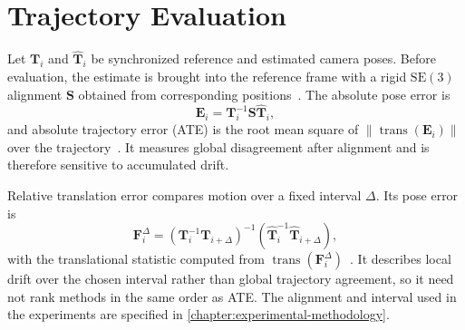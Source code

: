\section{Trajectory Evaluation}

Let $\mathbf{T}_i$ and $\widehat{\mathbf{T}}_i$ be synchronized reference and estimated camera poses. Before evaluation, the estimate is brought into the reference frame with a rigid $\mathrm{SE}(3)$ alignment $\mathbf{S}$ obtained from corresponding positions~\cite{umeyama1991least}. The absolute pose error is
\begin{equation}
  \mathbf{E}_i = \mathbf{T}_i^{-1}\mathbf{S}\widehat{\mathbf{T}}_i,
\end{equation}
and absolute trajectory error (ATE) is the root mean square of $\lVert\operatorname{trans}(\mathbf{E}_i)\rVert$ over the trajectory~\cite{sturm2012benchmark}. It measures global disagreement after alignment and is therefore sensitive to accumulated drift.

Relative translation error compares motion over a fixed interval $\Delta$. Its pose error is
\begin{equation}
  \mathbf{F}_i^{\Delta}
  = \left(\mathbf{T}_i^{-1}\mathbf{T}_{i+\Delta}\right)^{-1}
    \left(\widehat{\mathbf{T}}_i^{-1}\widehat{\mathbf{T}}_{i+\Delta}\right),
\end{equation}
with the translational statistic computed from $\operatorname{trans}(\mathbf{F}_i^{\Delta})$~\cite{sturm2012benchmark}. It describes local drift over the chosen interval rather than global trajectory agreement, so it need not rank methods in the same order as ATE. The alignment and interval used in the experiments are specified in \autoref{chapter:experimental-methodology}.
